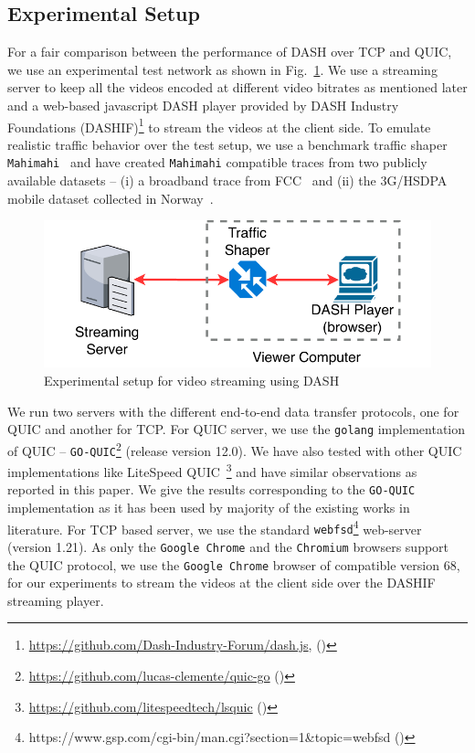 \subsection{Experimental Setup}
\label{chap03s2:sec:experimentalSetup}
For a fair comparison between the performance of DASH over TCP and QUIC,
we use an experimental test network as shown in Fig.~\ref{fig:chap03s2:expeirmental_setup}. We use a streaming server to keep all the videos encoded at different video bitrates as mentioned later and a web-based javascript DASH player provided by DASH Industry Foundations (DASHIF)\footnote{\url{https://github.com/Dash-Industry-Forum/dash.js}, (\lastaccessedtoday)} to stream the videos at the client side. To emulate realistic traffic behavior over the test setup, we use a benchmark traffic shaper {\tt Mahimahi}~\cite{mahimahi} and have created {\tt Mahimahi} compatible traces from two publicly available datasets -- (i) a broadband trace from FCC~\cite{dataset-fcc} and (ii) the 3G/HSDPA mobile dataset collected in Norway~\cite{dataset-norway}.

\begin{figure}[h]
	\centering
	\includegraphics[width=0.8\linewidth]{img/experimental_setup}
	\caption{\label{fig:chap03s2:expeirmental_setup}Experimental setup for video streaming using DASH}
\end{figure}

We run two servers with the different end-to-end data transfer protocols, one for QUIC and another for TCP. For QUIC server, we use the {\tt golang} implementation of QUIC -- \texttt{GO-QUIC}\footnote{\url{https://github.com/lucas-clemente/quic-go} (\lastaccessedtoday)} (release version 12.0). We have also tested with other QUIC implementations like LiteSpeed QUIC~\footnote{\url{https://github.com/litespeedtech/lsquic} (\lastaccessedtoday)} and have similar observations as reported in this paper. We give the results corresponding to the \texttt{GO-QUIC} implementation as it has been used by majority of the existing works in literature. For TCP based server, we use the standard {\tt webfsd}\footnote{https://www.gsp.com/cgi-bin/man.cgi?section=1\&topic=webfsd (\lastaccessedtoday)} web-server (version 1.21). As only the {\tt Google Chrome} and the {\tt Chromium} browsers support the QUIC protocol, we use the {\tt Google Chrome} browser of compatible version 68, for our experiments to stream the videos at the client side over the DASHIF streaming player.


